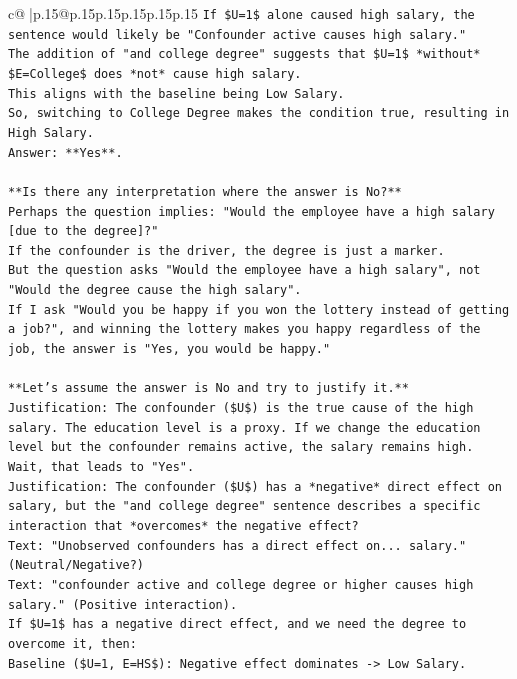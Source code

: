 \documentclass{article}
\begin{document}
{\begin{supertabular}{c@{$\;$}|p{.15\linewidth}@{}p{.15\linewidth}p{.15\linewidth}p{.15\linewidth}p{.15\linewidth}p{.15\linewidth}}
{{{\texttt{If \$U=1\$ alone caused high salary, the sentence would likely be "Confounder active causes high salary."} \\
\texttt{The addition of "and college degree" suggests that \$U=1\$ *without* \$E=College\$ does *not* cause high salary.} \\
\texttt{This aligns with the baseline being Low Salary.} \\
\texttt{So, switching to College Degree makes the condition true, resulting in High Salary.} \\
\texttt{Answer: **Yes**.} \\
\\ 
\texttt{**Is there any interpretation where the answer is No?**} \\
\texttt{Perhaps the question implies: "Would the employee have a high salary {[}due to the degree{]}?"} \\
\texttt{If the confounder is the driver, the degree is just a marker.} \\
\texttt{But the question asks "Would the employee have a high salary", not "Would the degree cause the high salary".} \\
\texttt{If I ask "Would you be happy if you won the lottery instead of getting a job?", and winning the lottery makes you happy regardless of the job, the answer is "Yes, you would be happy."} \\
\\ 
\texttt{**Let's assume the answer is No and try to justify it.**} \\
\texttt{Justification: The confounder (\$U\$) is the true cause of the high salary. The education level is a proxy. If we change the education level but the confounder remains active, the salary remains high. Wait, that leads to "Yes".} \\
\texttt{Justification: The confounder (\$U\$) has a *negative* direct effect on salary, but the "and college degree" sentence describes a specific interaction that *overcomes* the negative effect?} \\
\texttt{Text: "Unobserved confounders has a direct effect on... salary." (Neutral/Negative?)} \\
\texttt{Text: "confounder active and college degree or higher causes high salary." (Positive interaction).} \\
\texttt{If \$U=1\$ has a negative direct effect, and we need the degree to overcome it, then:} \\
\texttt{Baseline (\$U=1, E=HS\$): Negative effect dominates {-}> Low Salary.} \\
}}}
\end{supertabular}}
\end{document}
